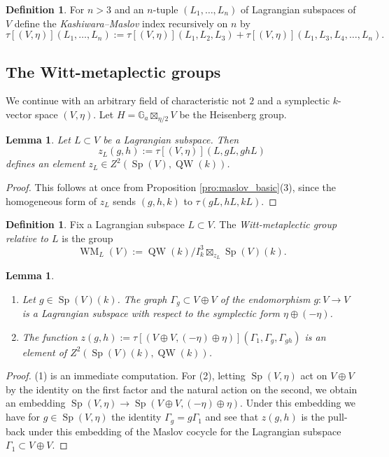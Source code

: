 \documentclass{article}
\def\mb#1{\mathbb{#1}}
\DeclareMathOperator{\Sp}{Sp}
\newtheorem{lem}[thm]{Lemma}
\theoremstyle{definition}
\newtheorem{dfn}[thm]{Definition}
\numberwithin{equation}{subsection}
\renewcommand{\-}{\hyp{}}
\DeclareMathOperator{\WM}{WM}
\DeclareMathOperator{\QW}{QW}
\begin{document}
\begin{appendices}
\begin{dfn}
	For $n>3$ and an $n$-tuple $(L_1,\dots,L_n)$ of Lagrangian subspaces of $V$ define the \emph{Kashiwara--Maslov} index recursively on $n$ by
	\[ \tau[(V,\eta)](L_1,\dots,L_n) :=  \tau[(V,\eta)](L_1,L_2,L_3)+\tau[(V,\eta)](L_1,L_3,L_4,\dots,L_n). \]
\end{dfn}


\subsection{The Witt-metaplectic groups} \label{sub:wittmeta}

We continue with an arbitrary field of characteristic not $2$ and a symplectic $k$-vector space $(V,\eta)$. Let $H=\mb{G}_a \boxtimes_{\eta/2} V$ be the Heisenberg group.

\begin{lem} \label{maslov_cocycle}
	Let $L \subset V$ be a Lagrangian subspace. Then 
	\[ z_L(g,h):=\tau[(V,\eta)](L,gL,ghL) \]
	defines an element $z_L \in Z^2(\Sp(V),\QW(k))$.
\end{lem}
\begin{proof}
	This follows at once from Proposition \ref{pro:maslov_basic}(3), since the homogeneous form of $z_L$ sends $(g,h,k)$ to $\tau(gL,hL,kL)$.
\end{proof}

\begin{dfn}
	Fix a Lagrangian subspace $L \subset V$. 
The \emph{Witt-metaplectic group relative to $L$} is the group\index[notation]{WML@$\WM_L$} 
		\[ \WM_L(V) := \QW(k)/I_k^3 \boxtimes_{z_L} \Sp(V)(k). \]


\end{dfn}

\begin{lem}
	\begin{enumerate}
		\item Let $g \in \Sp(V)(k)$. The graph $\Gamma_g \subset V \oplus V$ of the endomorphism $g : V \to V$ is a Lagrangian subspace with respect to the symplectic form $\eta \oplus (-\eta)$.
		\item The function $z(g,h):=\tau[(V\oplus V,(-\eta) \oplus \eta)](\Gamma_1,\Gamma_g,\Gamma_{gh})$ is an element of $Z^2(\Sp(V)(k),\QW(k))$.
	\end{enumerate}
\end{lem}
\begin{proof}
	(1) is an immediate computation. For (2), letting $\Sp(V,\eta)$ act on $V \oplus V$ by the identity on the first factor and the natural action on the second, we obtain an embedding $\Sp(V,\eta) \to \Sp(V \oplus V,(-\eta) \oplus \eta)$. Under this embedding we have for $g \in \Sp(V,\eta)$ the identity $\Gamma_g=g\Gamma_1$ and see that $z(g,h)$ is the pull-back under this embedding of the Maslov cocycle for the Lagrangian subspace $\Gamma_1 \subset V \oplus V$. 
\end{proof}


\end{appendices}
\end{document}
